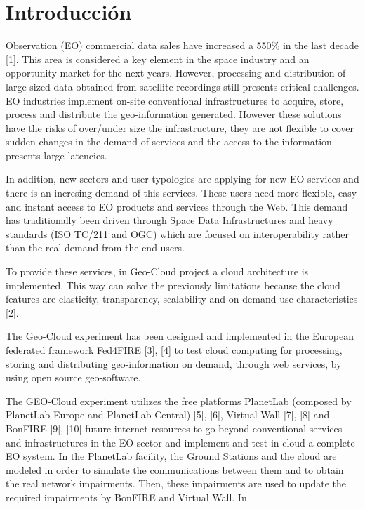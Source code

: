 \chapter{Introducción}

 Observation (EO) commercial data sales have increased a 550\% in
the last decade \cite{sousa}[1]. This area is considered a key element in the
space industry and an opportunity market for the next years. However, processing
and distribution of large-sized data obtained from satellite recordings still presents critical challenges. 
EO industries implement on-site conventional infrastructures to acquire, store, process and distribute the geo-information generated. However these solutions have the risks of over/under size the infrastructure, they are not flexible to cover sudden changes in the demand of services and the access to the information presents large latencies. 

In addition, new sectors and user typologies are applying for new EO services
and there is an incresing demand of this services. These users
need more flexible, easy and instant access to EO products and services through
the Web. This demand has traditionally been driven through Space Data
Infrastructures and heavy standards (ISO TC/211 and OGC) which are focused on
interoperability rather than the real demand from the end-users. 

To provide these services, in Geo-Cloud project a cloud architecture is
implemented. This way can solve the previously limitations because the cloud features are elasticity, transparency, scalability and on-demand use characteristics [2]. 

The Geo-Cloud experiment has been designed and implemented in the European federated framework Fed4FIRE [3], [4] to test cloud computing for processing, storing and distributing geo-information on demand, through web services, by using open source geo-software.
	
The GEO-Cloud experiment utilizes the free platforms PlanetLab (composed by
PlanetLab Europe and PlanetLab Central) [5], [6], Virtual Wall [7], [8] and
BonFIRE [9], [10] future internet resources to go beyond conventional services
and infrastructures in the EO sector and implement and test in cloud a complete
EO system. In the PlanetLab facility, the Ground Stations and the cloud are
modeled in order to simulate the communications between them and to obtain the
real network impairments. Then, these impairments are used to update the
required impairments by BonFIRE and Virtual Wall.
In  

